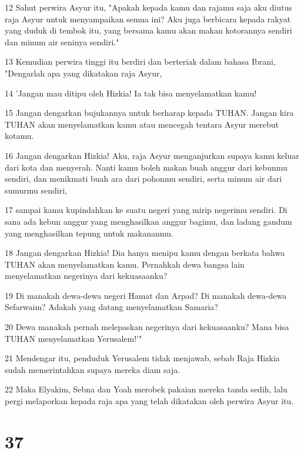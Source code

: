 \par 12 Sahut perwira Asyur itu, "Apakah kepada kamu dan rajamu saja aku diutus raja Asyur untuk menyampaikan semua ini? Aku juga berbicara kepada rakyat yang duduk di tembok itu, yang bersama kamu akan makan kotorannya sendiri dan minum air seninya sendiri."
\par 13 Kemudian perwira tinggi itu berdiri dan berteriak dalam bahasa Ibrani, "Dengarlah apa yang dikatakan raja Asyur,
\par 14 'Jangan mau ditipu oleh Hizkia! Ia tak bisa menyelamatkan kamu!
\par 15 Jangan dengarkan bujukannya untuk berharap kepada TUHAN. Jangan kira TUHAN akan menyelamatkan kamu atau mencegah tentara Asyur merebut kotamu.
\par 16 Jangan dengarkan Hizkia! Aku, raja Asyur menganjurkan supaya kamu keluar dari kota dan menyerah. Nanti kamu boleh makan buah anggur dari kebunmu sendiri, dan menikmati buah ara dari pohonmu sendiri, serta minum air dari sumurmu sendiri,
\par 17 sampai kamu kupindahkan ke suatu negeri yang mirip negerimu sendiri. Di sana ada kebun anggur yang menghasilkan anggur bagimu, dan ladang gandum yang menghasilkan tepung untuk makananmu.
\par 18 Jangan dengarkan Hizkia! Dia hanya menipu kamu dengan berkata bahwa TUHAN akan menyelamatkan kamu. Pernahkah dewa bangsa lain menyelamatkan negerinya dari kekuasaanku?
\par 19 Di manakah dewa-dewa negeri Hamat dan Arpad? Di manakah dewa-dewa Sefarwaim? Adakah yang datang menyelamatkan Samaria?
\par 20 Dewa manakah pernah melepaskan negerinya dari kekuasaanku? Mana bisa TUHAN menyelamatkan Yerusalem!'"
\par 21 Mendengar itu, penduduk Yerusalem tidak menjawab, sebab Raja Hizkia sudah memerintahkan supaya mereka diam saja.
\par 22 Maka Elyakim, Sebna dan Yoah merobek pakaian mereka tanda sedih, lalu pergi melaporkan kepada raja apa yang telah dikatakan oleh perwira Asyur itu.

\chapter{37}

